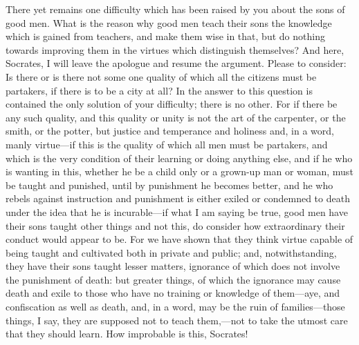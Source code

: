 \documentclass[11pt,letter]{article}
\begin{document}
\par  There yet remains one difficulty which has been raised by you about the sons of good men. What is the reason why good men teach their sons the knowledge which is gained from teachers, and make them wise in that, but do nothing towards improving them in the virtues which distinguish themselves? And here, Socrates, I will leave the apologue and resume the argument. Please to consider: Is there or is there not some one quality of which all the citizens must be partakers, if there is to be a city at all? In the answer to this question is contained the only solution of your difficulty; there is no other. For if there be any such quality, and this quality or unity is not the art of the carpenter, or the smith, or the potter, but justice and temperance and holiness and, in a word, manly virtue—if this is the quality of which all men must be partakers, and which is the very condition of their learning or doing anything else, and if he who is wanting in this, whether he be a child only or a grown-up man or woman, must be taught and punished, until by punishment he becomes better, and he who rebels against instruction and punishment is either exiled or condemned to death under the idea that he is incurable—if what I am saying be true, good men have their sons taught other things and not this, do consider how extraordinary their conduct would appear to be. For we have shown that they think virtue capable of being taught and cultivated both in private and public; and, notwithstanding, they have their sons taught lesser matters, ignorance of which does not involve the punishment of death: but greater things, of which the ignorance may cause death and exile to those who have no training or knowledge of them—aye, and confiscation as well as death, and, in a word, may be the ruin of families—those things, I say, they are supposed not to teach them,—not to take the utmost care that they should learn. How improbable is this, Socrates!
\end{document}
